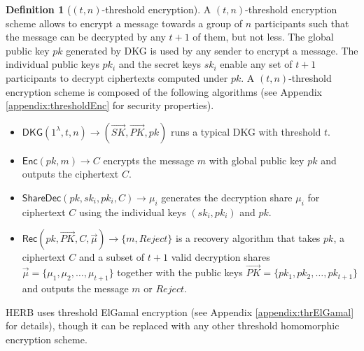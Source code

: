 \documentclass[letterpaper,twocolumn,10pt]{article}
\theoremstyle{definition}
\newtheorem{definition}[theorem]{Definition}
\theoremstyle{remark}
\begin{document}
\begin{definition}[$(t, n)$-threshold encryption] 
A $(t, n)$-threshold encryption scheme allows to encrypt a message towards a group of $n$ participants such that the message can be decrypted by any $t + 1$ of them, but not less. The global public key $pk$ generated by DKG is used by any sender to encrypt a message. The individual public keys $pk_i$ and the secret keys $sk_i$ enable any set of $t + 1$ participants to decrypt ciphertexts computed under $pk$. A $(t, n)$-threshold encryption scheme is composed of the following algorithms (see Appendix \ref{appendix:thresholdEnc} for security properties).
\begin{itemize}
    \item $\mathsf{DKG}(1^\lambda, t, n) \rightarrow (\vec{SK}, \vec{PK}, pk)$ runs a typical DKG with threshold $t$.
    \item $\mathsf{Enc}(pk, m) \rightarrow C$ encrypts the message $m$ with global public key $pk$ and outputs the ciphertext $C$.
    \item $\mathsf{ShareDec}(pk, sk_i, pk_i, C) \rightarrow \mu_i$ generates the decryption share $\mu_i$ for ciphertext $C$ using the individual keys $(sk_i, pk_i)$ and $pk$.
    \item $\mathsf{Rec}(pk, \vec{PK}, C, \vec{\mu} )\rightarrow \{m, Reject\}$ is a recovery algorithm that takes $pk$, a ciphertext $C$ and a subset of $t + 1$ valid decryption shares $\vec{\mu} = \{\mu_1, \mu_2,\ldots, \mu_{t + 1}\}$ together with the public keys $\vec{PK} = \{pk_1, pk_2,\ldots, pk_{t + 1}\}$ and outputs the message $m$ or $Reject$.
\end{itemize}
\end{definition}

HERB \cite{cherniaeva2019homomorphic} uses threshold ElGamal encryption \cite{desmedt1990Threshold} (see Appendix \ref{appendix:thrElGamal} for details), though it can be replaced with any other threshold homomorphic encryption scheme.\\
\end{document}
